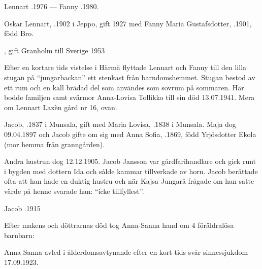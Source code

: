 Lennart .1976  ---  Fanny .1980.





Oskar Lennart, .1902 i Jeppo, gift 1927 med Fanny Maria Gustafsdotter, .1901, född Bro.
\begin{jhchildren}
  \item {}, gift Granholm till Sverige 1953
  \item {}
  \item {}
\end{jhchildren}

Efter en kortare tids vistelse i Härmä flyttade Lennart och Fanny till den lilla stugan på ``jungarbackan'' ett stenkast från barndomshemmet. Stugan bestod av ett rum och en kall brädad del som användes som sovrum på sommaren. Här bodde familjen samt svärmor Anna-Lovisa Tollikko till sin död 13.07.1941. Mera om Lennart Laxèn gård nr 16, ovan.


Jacob, .1837 i Munsala, gift med Maria Lovisa, .1838 i Munsala. Maja dog 09.04.1897 och Jacob gifte om sig med Anna Sofia, .1869, född Yrjösdotter Ekola (mor hemma från granngården).
\begin{jhchildren}
  \item {}
  \item {}
  \item {}
\end{jhchildren}
Andra hustrun dog 12.12.1905. Jacob Jansson var gårdfarihandlare och gick runt i bygden med dottern Ida och sålde kammar tillverkade av horn. Jacob berättade ofta att han hade en duktig hustru och när Kajsa Jungarå frågade om han satte värde på henne svarade han: ``icke tillfyllest''.

Jacob .1915





Efter makens och döttrarnas död tog Anna-Sanna hand om 4 föräldralösa barnbarn:
\begin{jhchildren}
  \item {}
  \item {}
  \item {}
  \item {}
\end{jhchildren}
Anna Sanna avled i ålderdomsavtynande efter en kort tids svår sinnessjukdom 17.09.1923.


